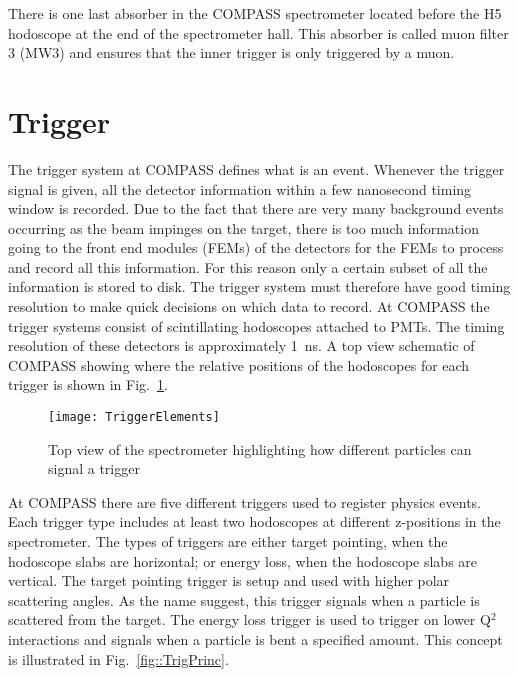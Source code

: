 There is one last absorber in the COMPASS spectrometer located before the H5
hodoscope at the end of the spectrometer hall.  This absorber is called muon
filter 3 (MW3) and ensures that the inner trigger is only triggered by a
muon. \par


\section{Trigger} \label{sec::trigger}
The trigger system at COMPASS defines what is an event.  Whenever the trigger
signal is given, all the detector information within a few nanosecond timing
window is recorded.  Due to the fact that there are very many background events
occurring as the beam impinges on the target, there is too much information
going to the front end modules (FEMs) of the detectors for the FEMs to process
and record all this information.  For this reason only a certain subset of all
the information is stored to disk.  The trigger system must therefore have good
timing resolution to make quick decisions on which data to record.  At COMPASS
the trigger systems consist of scintillating hodoscopes attached to PMTs.  The
timing resolution of these detectors is approximately 1~ns.  A top view
schematic of COMPASS showing where the relative positions of the hodoscopes for
each trigger is shown in Fig.~\ref{fig::TriggerElements}.  \par

\begin{figure}[h!t]
  \centering
  \texttt{[image: TriggerElements]}
  \caption{Top view of the spectrometer highlighting how different particles can
    signal a trigger}
  \label{fig::TriggerElements}
\end{figure}

At COMPASS there are five different triggers used to register physics events.
Each trigger type includes at least two hodoscopes at different z-positions in
the spectrometer.  The types of triggers are either target pointing, when the
hodoscope slabs are horizontal; or energy loss, when the hodoscope slabs are
vertical.  The target pointing trigger is setup and used with higher polar
scattering angles.  As the name suggest, this trigger signals when a particle is
scattered from the target.  The energy loss trigger is used to trigger on lower
Q$^2$ interactions and signals when a particle is bent a specified amount.
This concept is illustrated in Fig.~\ref{fig::TrigPrinc}.  \par

